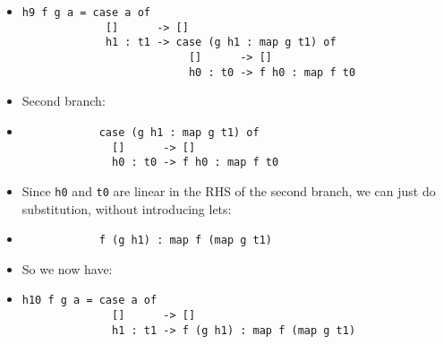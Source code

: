 \documentclass{beamer}
\begin{document}
\begin{frame}[fragile]

    \begin{itemize}[<+->]
        \item[]
            \begin{verbatim}
h9 f g a = case a of
             []      -> []
             h1 : t1 -> case (g h1 : map g t1) of
                          []      -> []
                          h0 : t0 -> f h0 : map f t0
            \end{verbatim}

        \item[] Second branch:

        \item[]
            \begin{verbatim}
            case (g h1 : map g t1) of
              []      -> []
              h0 : t0 -> f h0 : map f t0
            \end{verbatim}

        \item[]
            Since \texttt{h0} and \texttt{t0} are linear in the RHS of the
            second branch, we can just do substitution, without introducing
            lets:

        \item[]
            \begin{verbatim}
            f (g h1) : map f (map g t1)
            \end{verbatim}

        \item[] So we now have:

        \item[]
            \begin{verbatim}
h10 f g a = case a of
              []      -> []
              h1 : t1 -> f (g h1) : map f (map g t1)
            \end{verbatim}

    \end{itemize}

\end{frame}
\end{document}
